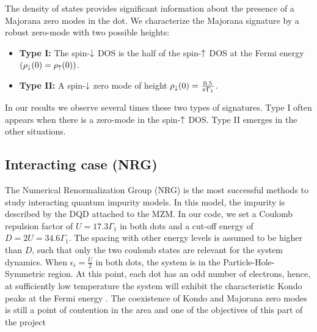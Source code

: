 \documentclass[showpacs,aps,prb,reprint,superscriptaddress]{revtex4-1}
\begin{document}
The density of states provides significant information about the presence of a Majorana zero modes in the dot. We characterize the Majorana signature by a robust zero-mode with two possible heights:
 \begin{itemize}
         \item \textbf{Type I: }  The spin-$\downarrow$ DOS is the half of the spin-$\uparrow$ DOS  at the Fermi energy $(\rho_\downarrow(0)=\rho_\uparrow(0))$. 
         \item \textbf{Type II: } A spin-$\downarrow$ zero mode of height $ \rho_\downarrow(0) = \frac{0.5}{\pi  \Gamma_1}$. 
     \end{itemize}
In our results we observe several times these two types of signatures. Type I often appears when there is a zero-mode in the spin-$\uparrow$ DOS. Type II emerges in the other situations. 



\subsection{Interacting case (NRG) \label{sec:NRG-interacting}}


The Numerical Renormalization Group (NRG) \cite{wilson_renormalization_1975,sindel_numerical_2005,bulla_numerical_2008} is the most successful methods to study interacting quantum impurity models. In this model, the impurity is described by the DQD attached to the MZM. In our code, we set a Coulomb repulsion factor of $U =17.3\Gamma_1$ in both dots and a cut-off energy of $D=2U=34.6\Gamma_1$. The spacing with other energy levels is assumed to be higher than $D$, such that only the two coulomb states are relevant for the system dynamics. When  $\epsilon_i = \frac{U}{2}$ in both dots, the system is in the Particle-Hole-Symmetric region. At this point, each dot has an odd number of electrons, hence, at sufficiently low temperature the system will exhibit the characteristic Kondo peaks at the Fermi energy \citet{wilson_renormalization_1975}. The coexistence of Kondo and Majorana zero modes is still a point of contention in the area and one of the objectives of this part of the project
\end{document}
